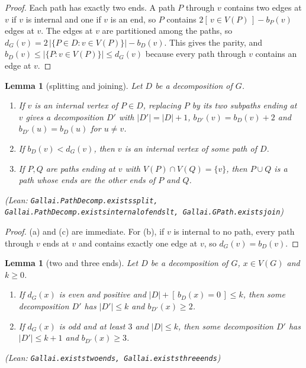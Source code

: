 \documentclass[11pt]{amsart}
\newtheorem{lemma}[theorem]{Lemma}
\theoremstyle{definition}
\theoremstyle{remark}
\renewcommand{\_}{\oldunderscore\allowbreak}
\newcommand{\leanst}[1]{\par{\raggedright\small\textup{(Lean: \texttt{#1})}\par}}
\newcommand{\ind}[1]{[\,#1\,]}
\begin{document}
\begin{proof}
Each path has exactly two ends. A path $P$ through $v$ contains two edges at $v$ if $v$ is internal
and one if $v$ is an end, so $P$ contains $2\ind{v\in V(P)}-b_P(v)$ edges at $v$. The edges at $v$
are partitioned among the paths, so $d_G(v)=2\,|\{P\in D:v\in V(P)\}|-b_D(v)$. This gives the
parity, and $b_D(v)\le |\{P:v\in V(P)\}|\le d_G(v)$ because every path through $v$ contains an edge
at $v$.
\end{proof}

\begin{lemma}[splitting and joining]\label{lem:split}
Let $D$ be a decomposition of $G$.
\begin{enumerate}[label=\textup{(\alph*)}]
\item If $v$ is an internal vertex of $P\in D$, replacing $P$ by its two subpaths ending at $v$ gives
a decomposition $D'$ with $|D'|=|D|+1$, $b_{D'}(v)=b_D(v)+2$ and $b_{D'}(u)=b_D(u)$ for $u\ne v$.
\item If $b_D(v)<d_G(v)$, then $v$ is an internal vertex of some path of $D$.
\item If $P,Q$ are paths ending at $v$ with $V(P)\cap V(Q)=\{v\}$, then $P\cup Q$ is a path whose ends
are the other ends of $P$ and $Q$.
\end{enumerate}
\leanst{Gallai.PathDecomp.exists\_split, Gallai.PathDecomp.exists\_internal\_of\_ends\_lt,
Gallai.GPath.exists\_join}
\end{lemma}

\begin{proof}
(a) and (c) are immediate. For (b), if $v$ is internal to no path, every path through $v$ ends at
$v$ and contains exactly one edge at $v$, so $d_G(v)=b_D(v)$.
\end{proof}

\begin{lemma}[two and three ends]\label{lem:ends}
Let $D$ be a decomposition of $G$, $x\in V(G)$ and $k\ge0$.
\begin{enumerate}[label=\textup{(\alph*)}]
\item If $d_G(x)$ is even and positive and $|D|+\ind{b_D(x)=0}\le k$, then some decomposition $D'$
has $|D'|\le k$ and $b_{D'}(x)\ge2$.
\item If $d_G(x)$ is odd and at least $3$ and $|D|\le k$, then some decomposition $D'$ has
$|D'|\le k+1$ and $b_{D'}(x)\ge3$.
\end{enumerate}
\leanst{Gallai.exists\_two\_ends, Gallai.exists\_three\_ends}
\end{lemma}
\end{document}
